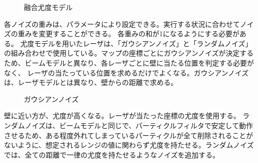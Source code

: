\begin{enumerate}
\begin{figure}[h]
\begin{center}
        \caption{融合尤度モデル}
        \label{auto:navstack:yugo}
      \end{center}
    \end{figure}
    各ノイズの重みは、パラメータにより設定できる。実行する状況に合わせてノイズの重みを変更することができる。
    各重みの和が1になるようにする必要がある。
    尤度モデルを用いたレーザは、「ガウシアンノイズ」と「ランダムノイズ」の組み合わせで使用している。マップの座標ごとにガウシアンノイズが決定するため、ビームモデルと異なり、各レーザごとに壁に当たる位置を判定する必要がなく、
    レーザの当たっている位置を求めるだけでよくなる。ガウシアンノイズは、レーザモデルとは異なり、壁からの距離で求める。
    \begin{figure}[h]
      \begin{center}
        \caption{ガウシアンノイズ}
        \label{auto:navstack:gaussian_noise}
      \end{center}
    \end{figure}
    壁に近い方が、尤度が高くなる。レーザが当たった座標の尤度を使用する。
    ランダムノイズは、ビームモデルと同じで、パーティクルフィルタで安定して動作させるため、ある程度外れてしまっているパーティクルが全て削除されることがないように、想定されるレンジの値に関わらず尤度を持たせる。ランダムノイズでは、全ての距離で一律の尤度を持たせるようなノイズを追加する。

\end{enumerate}
